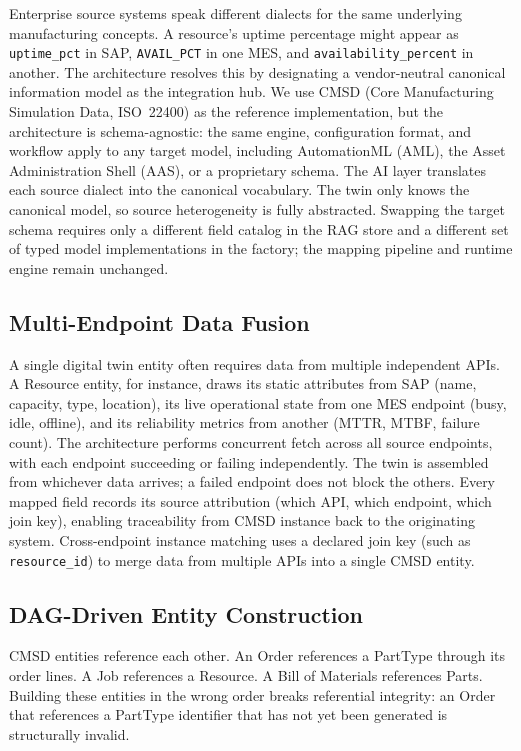 \documentclass[3p,times,procedia]{elsarticle}
\begin{document}
Enterprise source systems speak different dialects for the same underlying manufacturing concepts. A resource's uptime percentage might appear as \texttt{uptime\_pct} in SAP, \texttt{AVAIL\_PCT} in one MES, and \texttt{availability\_percent} in another. The architecture resolves this by designating a vendor-neutral canonical information model as the integration hub. We use CMSD (Core Manufacturing Simulation Data, ISO~22400) as the reference implementation, but the architecture is schema-agnostic: the same engine, configuration format, and workflow apply to any target model, including AutomationML (AML), the Asset Administration Shell (AAS), or a proprietary schema. The AI layer translates each source dialect into the canonical vocabulary. The twin only knows the canonical model, so source heterogeneity is fully abstracted. Swapping the target schema requires only a different field catalog in the RAG store and a different set of typed model implementations in the factory; the mapping pipeline and runtime engine remain unchanged.

\subsection{Multi-Endpoint Data Fusion}
\label{sec:arch-fusion}

A single digital twin entity often requires data from multiple independent APIs. A Resource entity, for instance, draws its static attributes from SAP (name, capacity, type, location), its live operational state from one MES endpoint (busy, idle, offline), and its reliability metrics from another (MTTR, MTBF, failure count). The architecture performs concurrent fetch across all source endpoints, with each endpoint succeeding or failing independently. The twin is assembled from whichever data arrives; a failed endpoint does not block the others. Every mapped field records its source attribution (which API, which endpoint, which join key), enabling traceability from CMSD instance back to the originating system. Cross-endpoint instance matching uses a declared join key (such as \texttt{resource\_id}) to merge data from multiple APIs into a single CMSD entity.

\subsection{DAG-Driven Entity Construction}
\label{sec:arch-dag}

CMSD entities reference each other. An Order references a PartType through its order lines. A Job references a Resource. A Bill of Materials references Parts. Building these entities in the wrong order breaks referential integrity: an Order that references a PartType identifier that has not yet been generated is structurally invalid.
\end{document}
